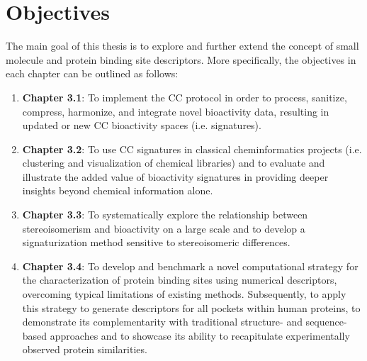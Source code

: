 \chapter{Objectives}
\label{objectives}
\clearpage

The main goal of this thesis is to explore and further extend the concept of small molecule and protein binding site descriptors. More specifically, the objectives in each chapter can be outlined as follows:

\begin{enumerate}

\item \textbf{Chapter 3.1}: To implement the CC protocol in order to process, sanitize, compress, harmonize, and integrate novel bioactivity data, resulting in updated or new CC bioactivity spaces (i.e. signatures). 

\item \textbf{Chapter 3.2}: To use CC signatures in classical cheminformatics projects (i.e. clustering and visualization of chemical libraries) and to evaluate and illustrate the added value of bioactivity signatures in providing deeper insights beyond chemical information alone.

\item \textbf{Chapter 3.3}: To systematically explore the relationship between stereoisomerism and bioactivity on a large scale and to develop a signaturization method sensitive to stereoisomeric differences. 

\item \textbf{Chapter 3.4}: To develop and benchmark a novel computational strategy for the characterization of protein binding sites using numerical descriptors, overcoming typical limitations of existing methods. Subsequently, to apply this strategy to generate descriptors for all pockets within human proteins, to demonstrate its complementarity with traditional structure- and sequence-based approaches and to showcase its ability to recapitulate experimentally observed protein similarities.

\end{enumerate}